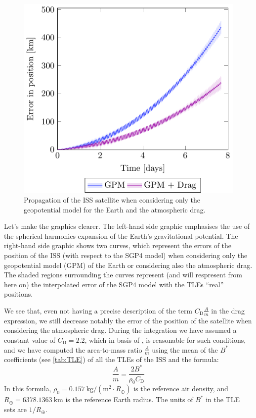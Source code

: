 \documentclass[../main.tex]{subfiles}
\begin{document}
\begin{figure}[htbp]
\begin{minipage}[ht]{0.45\textwidth}
    \includegraphics[width=\textwidth]{Images/simulation/ISS.pdf}
    \caption{Propagation of the ISS satellite when considering only the geopotential model for the Earth and the atmospheric drag.}
    \label{fig:ISS}
  \end{minipage}
\end{figure}

Let's make the graphics clearer. The left-hand side graphic emphasises the use of the spherical harmonics expansion of the Earth's gravitational potential. The right-hand side graphic shows two curves, which represent the errors of the position of the ISS (with respect to the SGP4 model) when considering only the geopotential model (GPM) of the Earth or considering also the atmospheric drag. The shaded regions surrounding the curves represent (and will respresent from here on) the interpolated error of the SGP4 model with the TLEs ``real'' positions.

We see that, even not having a precise description of the term $C_\mathrm{D}\frac{A}{m}$ in the drag expression, we still decrease notably the error of the position of the satellite when considering the atmospheric drag. During the integration we have assumed a constant value of $C_\mathrm{D}=2.2$, which in basis of \cite{montenbruck}, is reasonable for such conditions, and we have computed the area-to-mass ratio $\frac{A}{m}$ using the mean of the $B^*$ coefficients (see \cref{tab:TLE}) of all the TLEs of the ISS and the formula:
\begin{equation}
  \frac{A}{m}=\frac{2 B^*}{\rho_0 C_\mathrm{D}}
\end{equation}
In this formula, $\rho_0=0.157\ \mathrm{kg}/(\mathrm{m}^2 \cdot R_\oplus)$ is the reference air density, and $R_\oplus=6378.1363\ \mathrm{km}$ is the reference Earth radius. The units of $B^*$ in the TLE sets are $1 / R_\oplus$.
\end{document}
